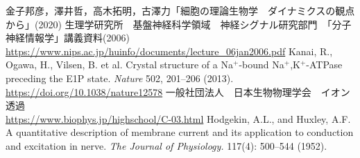 \documentclass[a4paper,11pt]{jsarticle}
\begin{document}
\begin{thebibliography}{99}
    金子邦彦，澤井哲，高木拓明，古澤力「細胞の理論生物学　ダイナミクスの観点から」(2020)
    生理学研究所　基盤神経科学領域　神経シグナル研究部門　「分子神経情報学」講義資料(2006) \\
    \url{https://www.nips.ac.jp/huinfo/documents/lecture_06jan2006.pdf}
    Kanai, R., Ogawa, H., Vilsen, B. et al. Crystal structure of a Na$^+$-bound Na$^+$,K$^+$-ATPase preceding the E1P state. \textit{Nature} 502, 201–206 (2013). \\
    \url{https://doi.org/10.1038/nature12578} 
    一般社団法人　日本生物物理学会　イオン透過 \\
    \url{https://www.biophys.jp/highschool/C-03.html}
    Hodgekin, A.L., and Huxley, A.F. 
    A quantitative description of membrane current and its application to conduction and excitation in nerve. 
    \textit{The Journal of Physiology.} 117(4): 500–544 (1952).
\end{thebibliography}
\end{document}
